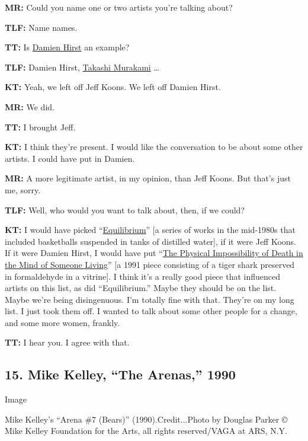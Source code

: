 \textbf{MR:} Could you name one or two artists you're talking about?

\textbf{TLF:} Name names.

\textbf{TT:} Is
\href{https://www.nytimes.com/topic/person/damien-hirst}{Damien Hirst}
an example?

\textbf{TLF:} Damien Hirst,
\href{https://www.nytimes.com/2016/02/14/t-magazine/art/takashi-murakami-art-collection-yokohama-museum.html}{Takashi
Murakami} \ldots{}

\textbf{KT:} Yeah, we left off Jeff Koons. We left off Damien Hirst.

\textbf{MR:} We did.

\textbf{TT:} I brought Jeff.

\textbf{KT:} I think they're present. I would like the conversation to
be about some other artists. I could have put in Damien.

\textbf{MR:} A more legitimate artist, in my opinion, than Jeff Koons.
But that's just me, sorry.

\textbf{TLF:} Well, who would you want to talk about, then, if we could?

\textbf{KT:} I would have picked
``\href{http://www.jeffkoons.com/artwork/equilibrium}{Equilibrium}''
{[}a series of works in the mid-1980s that included basketballs
suspended in tanks of distilled water{]}, if it were Jeff Koons. If it
were Damien Hirst, I would have put
``\href{http://www.damienhirst.com/the-physical-impossibility-of}{The
Physical Impossibility of Death in the Mind of Someone Living}'' {[}a
1991 piece consisting of a tiger shark preserved in formaldehyde in a
vitrine{]}. I think it's a really good piece that influenced artists on
this list, as did ``Equilibrium.'' Maybe they should be on the list.
Maybe we're being disingenuous. I'm totally fine with that. They're on
my long list. I just took them off. I wanted to talk about some other
people for a change, and some more women, frankly.

\textbf{TT:} I hear you. I agree with that.

\hypertarget{15-mike-kelley-the-arenas-1990}{%
\subsection{15. Mike Kelley, ``The Arenas,''
1990}\label{15-mike-kelley-the-arenas-1990}}

Image

Mike Kelley's ``Arena \#7 (Bears)'' (1990).Credit...Photo by Douglas
Parker © Mike Kelley Foundation for the Arts, all rights reserved/VAGA
at ARS, N.Y.


